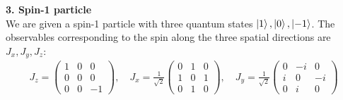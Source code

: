 \documentclass{article}
\theoremstyle{definition}
\newcommand{\f}[2]{\frac{#1}{#2}}
\begin{document}
\noindent \textbf{3. Spin-1 particle}\\

\noindent We are given a spin-1 particle with three quantum states $\ket{1},\ket{0},\ket{-1}$. The observables corresponding to the spin along the three spatial directions are $J_x,J_y,J_z$:
\begin{align*}
	J_z = \begin{pmatrix}
		1 & 0 & 0 \\
		0 & 0 & 0 \\
		0 & 0 & -1
	\end{pmatrix}, \quad 
	J_x = \f{1}{\sqrt{2}}\begin{pmatrix}
		0 &1 &0 \\ 
		1 &0 &1 \\
		0 &1 &0 
	\end{pmatrix}, \quad 
	J_y = \f{1}{\sqrt{2}}\begin{pmatrix}
		0 &-i &0 \\
		i &0 &-i \\
		0 &i &0 
	\end{pmatrix}
\end{align*}
\end{document}
